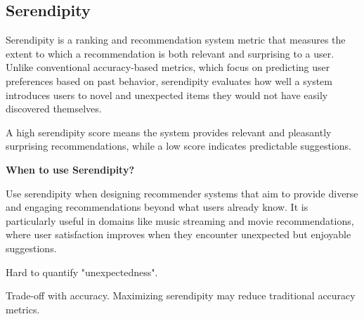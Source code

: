\subsection{Serendipity}

Serendipity is a ranking and recommendation system metric that measures the extent to which a recommendation is both
relevant and surprising to a user. Unlike conventional accuracy-based metrics, which focus on predicting user preferences
based on past behavior, serendipity evaluates how well a system introduces users to novel and unexpected items they would
not have easily discovered themselves.

\begin{center}
\end{center}

A high serendipity score means the system provides relevant and pleasantly surprising recommendations, while a low score
indicates predictable suggestions.

\textbf{When to use Serendipity?}

Use serendipity when designing recommender systems that aim to provide diverse and engaging recommendations beyond what
users already know. It is particularly useful in domains like music streaming and movie recommendations, where user
satisfaction improves when they encounter unexpected but enjoyable suggestions.

{
    \item Hard to quantify "unexpectedness".
    \item Trade-off with accuracy. Maximizing serendipity may reduce traditional accuracy metrics.
}

